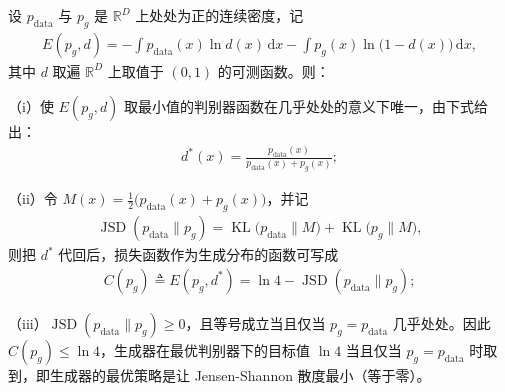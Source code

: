 \documentclass[../../main.tex]{subfiles}
\begin{document}
\begin{proposition}\label{proposition:ch17-最优判别器}
设 $p_{\mathrm{data}}$ 与 $p_g$ 是 $\mathbb{R}^D$ 上处处为正的连续密度，记
\begin{align*}
E(p_g,d)=-\int p_{\mathrm{data}}(x)\ln d(x)\,\mathrm{d}x-\int p_g(x)\ln\big(1-d(x)\big)\,\mathrm{d}x,
\end{align*}
其中 $d$ 取遍 $\mathbb{R}^D$ 上取值于 $(0,1)$ 的可测函数。则：

（i）使 $E(p_g,d)$ 取最小值的判别器函数在几乎处处的意义下唯一，由下式给出：
\begin{align}
d^*(x)=\frac{p_{\mathrm{data}}(x)}{p_{\mathrm{data}}(x)+p_g(x)};
\label{align:ch17-最优判别器}
\end{align}

（ii）令 $M(x)=\frac{1}{2}\big(p_{\mathrm{data}}(x)+p_g(x)\big)$，并记
\begin{align*}
\operatorname{JSD}(p_{\mathrm{data}}\|p_g)=\operatorname{KL}\big(p_{\mathrm{data}}\|M\big)+\operatorname{KL}\big(p_g\|M\big),
\end{align*}
则把 $d^*$ 代回后，损失函数作为生成分布的函数可写成
\begin{align}
C(p_g)\triangleq E(p_g,d^*)=\ln 4-\operatorname{JSD}(p_{\mathrm{data}}\|p_g);
\label{align:ch17-JSD}
\end{align}

（iii）$\operatorname{JSD}(p_{\mathrm{data}}\|p_g)\geqslant0$，且等号成立当且仅当 $p_g=p_{\mathrm{data}}$ 几乎处处。因此 $C(p_g)\leqslant\ln 4$，生成器在最优判别器下的目标值 $\ln 4$ 当且仅当 $p_g=p_{\mathrm{data}}$ 时取到，即生成器的最优策略是让 Jensen-Shannon 散度最小（等于零）。
\end{proposition}
\end{document}
